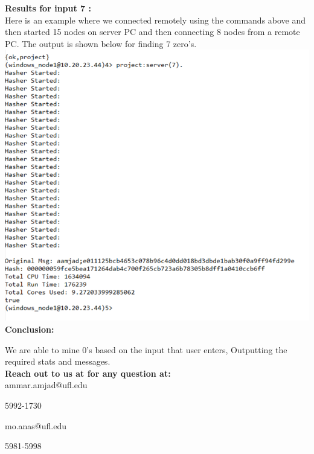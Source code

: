 \documentclass[11pt, pdftex]{article}
\begin{document}
	\textbf{Results for input 7 :} \\
	Here is an example where we connected remotely using the commands above and then started 15 nodes on server PC and then connecting 8 nodes from a remote PC. The output is shown below for finding 7 zero's. \\
	
	\includegraphics{Picture3.png} \\
	
	\textbf{Conclusion:} 
	
	We are able to mine 0’s based on the input that user enters, Outputting the required stats and messages.  \\
	
	\textbf{Reach out to us at for any question at:} \\
	
	
	ammar.amjad@ufl.edu
	
	5992-1730 
	
	mo.anas@ufl.edu
	
	5981-5998
	
	
	
\end{document}
